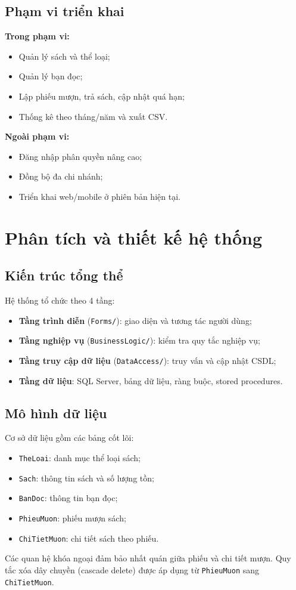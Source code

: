 \documentclass[12pt,a4paper]{article}
\begin{document}
\subsection{Phạm vi triển khai}
\textbf{Trong phạm vi:}
\begin{itemize}[leftmargin=1.5cm]
    \item Quản lý sách và thể loại;
    \item Quản lý bạn đọc;
    \item Lập phiếu mượn, trả sách, cập nhật quá hạn;
    \item Thống kê theo tháng/năm và xuất CSV.
\end{itemize}

\textbf{Ngoài phạm vi:}
\begin{itemize}[leftmargin=1.5cm]
    \item Đăng nhập phân quyền nâng cao;
    \item Đồng bộ đa chi nhánh;
    \item Triển khai web/mobile ở phiên bản hiện tại.
\end{itemize}

\section{Phân tích và thiết kế hệ thống}
\subsection{Kiến trúc tổng thể}
Hệ thống tổ chức theo 4 tầng:
\begin{itemize}[leftmargin=1.5cm]
    \item \textbf{Tầng trình diễn} (\texttt{Forms/}): giao diện và tương tác người dùng;
    \item \textbf{Tầng nghiệp vụ} (\texttt{BusinessLogic/}): kiểm tra quy tắc nghiệp vụ;
    \item \textbf{Tầng truy cập dữ liệu} (\texttt{DataAccess/}): truy vấn và cập nhật CSDL;
    \item \textbf{Tầng dữ liệu}: SQL Server, bảng dữ liệu, ràng buộc, stored procedures.
\end{itemize}

\subsection{Mô hình dữ liệu}
Cơ sở dữ liệu gồm các bảng cốt lõi:
\begin{itemize}[leftmargin=1.5cm]
    \item \texttt{TheLoai}: danh mục thể loại sách;
    \item \texttt{Sach}: thông tin sách và số lượng tồn;
    \item \texttt{BanDoc}: thông tin bạn đọc;
    \item \texttt{PhieuMuon}: phiếu mượn sách;
    \item \texttt{ChiTietMuon}: chi tiết sách theo phiếu.
\end{itemize}
Các quan hệ khóa ngoại đảm bảo nhất quán giữa phiếu và chi tiết mượn. Quy tắc xóa dây chuyền (cascade delete) được áp dụng từ \texttt{PhieuMuon} sang \texttt{ChiTietMuon}.
\end{document}
